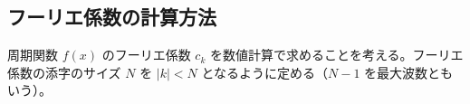 \subsection{フーリエ係数の計算方法}

周期関数 $f(x)$ のフーリエ係数 $c_k$ を数値計算で求めることを考える。フーリエ係数の添字のサイズ $N$ を $|k|<N$ となるように定める（$N-1$ を最大波数ともいう）。

